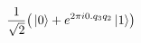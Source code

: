\documentclass[preview]{standalone}
\begin{document}
\begin{align*}
\frac{1}{\sqrt{2}} \bigr( \ket{0} + e^{2\pi i 0.q_{3}q_{2} } \ket{1}\bigr)
\end{align*}
\end{document}
